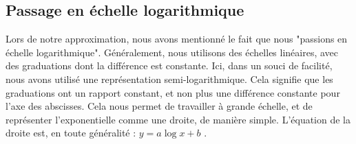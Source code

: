 \subsection{Passage en échelle logarithmique}
Lors de notre approximation, nous avons mentionné le fait que nous "passions en échelle logarithmique".
Généralement, nous utilisons des échelles linéaires, avec des graduations dont la différence est constante.
Ici, dans un souci de facilité, nous avons utilisé une représentation semi-logarithmique. Cela signifie
que les graduations ont un rapport constant, et non plus une différence constante pour l'axe des abscisses.
Cela nous permet de travailler à grande échelle, et de représenter l'exponentielle comme une droite, de
manière simple. L'équation de la droite est, en toute généralité : $y=a\log{x}+b$ .


